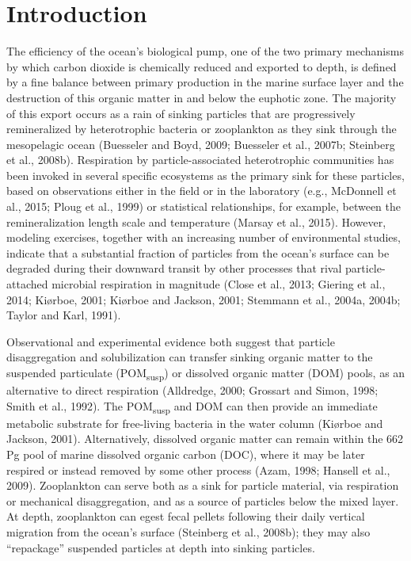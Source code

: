 \section{Introduction}
The efficiency of the ocean's biological pump, one of the two primary mechanisms by which carbon dioxide is chemically reduced and exported to depth, is defined by a fine balance between primary production in the marine surface layer and the destruction of this organic matter in and below the euphotic zone. The majority of this export occurs as a rain of sinking particles that are progressively remineralized by heterotrophic bacteria or zooplankton as they sink through the mesopelagic ocean (Buesseler and Boyd, 2009; Buesseler et al., 2007b; Steinberg et al., 2008b). Respiration by particle-associated heterotrophic communities has been invoked in several specific ecosystems as the primary sink for these particles, based on observations either in the field or in the laboratory (e.g., McDonnell et al., 2015; Ploug et al., 1999) or statistical relationships, for example, between the remineralization length scale and temperature (Marsay et al., 2015). However, modeling exercises, together with an increasing number of environmental studies, indicate that a substantial fraction of particles from the ocean's surface can be degraded during their downward transit by other processes that rival particle-attached microbial respiration in magnitude (Close et al., 2013; Giering et al., 2014; Ki\o{}rboe, 2001; Ki\o{}rboe and Jackson, 2001; Stemmann et al., 2004a, 2004b; Taylor and Karl, 1991).

Observational and experimental evidence both suggest that particle disaggregation and solubilization can transfer sinking organic matter to the suspended particulate (POM\textsubscript{susp}) or dissolved organic matter (DOM) pools, as an alternative to direct respiration (Alldredge, 2000; Grossart and Simon, 1998; Smith et al., 1992). The POM\textsubscript{susp} and DOM can then provide an immediate metabolic substrate for free-living bacteria in the water column (Ki\o{}rboe and Jackson, 2001). Alternatively, dissolved organic matter can remain within the 662 Pg pool of marine dissolved organic carbon (DOC), where it may be later respired or instead removed by some other process (Azam, 1998; Hansell et al., 2009). Zooplankton can serve both as a sink for particle material, via respiration or mechanical disaggregation, and as a source of particles below the mixed layer. At depth, zooplankton can egest fecal pellets following their daily vertical migration from the ocean's surface (Steinberg et al., 2008b); they may also ``repackage'' suspended particles at depth into sinking particles.

